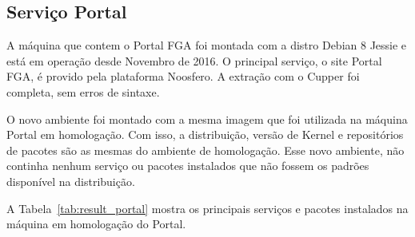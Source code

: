 \subsection{Serviço Portal}

A máquina que contem o Portal FGA foi montada com a distro Debian 8 Jessie
e está em operação desde Novembro de 2016. O principal serviço, o site Portal FGA,
é provido pela plataforma Noosfero. A extração com o Cupper foi completa,
sem erros de sintaxe.

O novo ambiente foi montado com a mesma imagem que foi utilizada na máquina
Portal em homologação. Com isso, a distribuição, versão de Kernel e repositórios
de pacotes são as mesmas do ambiente de homologação. Esse novo ambiente, não
continha nenhum serviço ou pacotes instalados que não fossem os padrões
disponível na distribuição.

A Tabela~\ref{tab:result_portal} mostra os principais serviços e pacotes instalados
na máquina em homologação do Portal.

